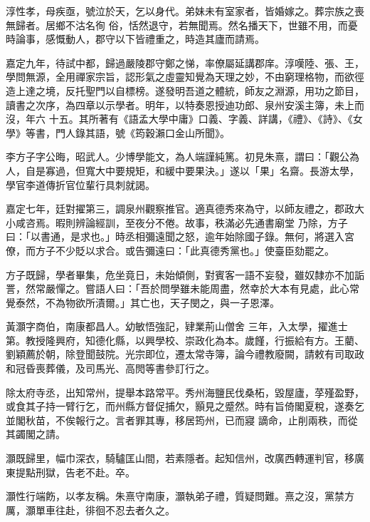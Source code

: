 \begin{pinyinscope}
 淳性孝，母疾亟，號泣於天，乞以身代。弟妹未有室家者，皆婚嫁之。葬宗族之喪無歸者。居鄉不沽名徇
 俗，恬然退守，若無聞焉。然名播天下，世雖不用，而憂時論事，感慨動人，郡守以下皆禮重之，時造其廬而請焉。



 嘉定九年，待試中都，歸過嚴陵郡守鄭之悌，率僚屬延講郡庠。淳嘆陸、張、王，學問無源，全用禪家宗旨，認形氣之虛靈知覺為天理之妙，不由窮理格物，而欲徑造上達之境，反托聖門以自標榜。遂發明吾道之體統，師友之淵源，用功之節目，讀書之次序，為四章以示學者。明年，以特奏恩授迪功郎、泉州安溪主簿，未上而沒，年六
 十五。其所著有《語孟大學中庸》口義、字義、詳講，《禮》、《詩》、《女學》等書，門人錄其語，號《筠穀瀨口金山所聞》。



 李方子字公晦，昭武人。少博學能文，為人端謹純篤。初見朱熹，謂曰：「觀公為人，自是寡過，但寬大中要規矩，和緩中要果決。」遂以「果」名齋。長游太學，學官李道傳折官位輩行具刺就謁。



 嘉定七年，廷對擢第三，調泉州觀察推官。適真德秀來為守，以師友禮之，郡政大小咸咨焉。暇則辨論經訓，至夜分不倦。故事，秩滿必先通書廟堂
 乃除，方子曰：「以書通，是求也。」時丞相彌遠聞之怒，逾年始除國子錄。無何，將選入宮僚，而方子不少貶以求合。或告彌遠曰：「此真德秀黨也。」使臺臣劾罷之。



 方子既歸，學者畢集，危坐竟日，未始傾側，對賓客一語不妄發，雖奴隸亦不加詬詈，然常嚴憚之。嘗語人曰：「吾於問學雖未能周盡，然幸於大本有見處，此心常覺泰然，不為物欲所漬爾。」其亡也，天子閔之，與一子恩澤。



 黃灝字商伯，南康都昌人。幼敏悟強記，肄業荊山僧舍
 三年，入太學，擢進士第。教授隆興府，知德化縣，以興學校、崇政化為本。歲饉，行振給有方。王藺、劉穎薦於朝，除登聞鼓院。光宗即位，遷太常寺簿，論今禮教廢闕，請敕有司取政和冠昏喪葬儀，及司馬光、高閌等書參訂行之。



 除太府寺丞，出知常州，提舉本路常平。秀州海鹽民伐桑柘，毀屋廬，莩殣盈野，或食其子持一臂行乞，而州縣方督促捕欠，顥見之蹙然。時有旨倚閣夏稅，遂奏乞並閣秋苗，不俟報行之。言者罪其專，移居筠州，已而寢
 謫命，止削兩秩，而從其蠲閣之請。



 灝既歸里，幅巾深衣，騎驢匡山間，若素隱者。起知信州，改廣西轉運判官，移廣東提點刑獄，告老不赴。卒。



 灝性行端飭，以孝友稱。朱熹守南康，灝執弟子禮，質疑問難。熹之沒，黨禁方厲，灝單車往赴，徘徊不忍去者久之。



\end{pinyinscope}